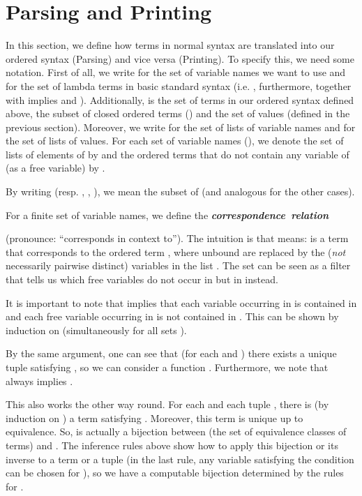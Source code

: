 \documentclass[submission,copyright,creativecommons]{eptcs}
\newcommand{\define}[1]{\mbox{\textbf{\textit{#1}}}}
\begin{document}
\section{Parsing and Printing}
\label{sec:parsing}

In this section, we define how terms in normal syntax are translated into our ordered syntax (Parsing) and vice versa (Printing). 
To specify this, we need some notation. 
First of all, we write  for the set of variable names we want to use and  for the set of lambda terms in basic standard syntax (i.e. , furthermore,  together with  implies  and ). Additionally,  is the set of terms in our ordered syntax defined above,  the subset of closed ordered terms () and  the set of values (defined in the previous section).
Moreover, we write  for the set of lists of variable names and  for the set of lists of values. 
For each set  of variable names (), we denote the set of lists of elements of  by  and the ordered terms that do not contain any variable of  (as a free variable) by .


By writing  (resp. , , ), we mean the subset  of  (and analogous for the other cases).

For a finite set  of variable names, we define the \define{correspondence relation}

(pronounce: ``corresponds in context  to'').
The intuition is that  means: 
 is a term that corresponds to the ordered term , where unbound
 are replaced by the (\emph{not} necessarily pairwise distinct)
variables in the list . 
The set  can be seen as a filter that tells us which free variables do not occur in  but in  instead.

It is important to note that  implies that each variable occurring in  is contained in  and each free variable occurring in  is not contained in . This can be shown by induction on  (simultaneously for all sets ). 

By the same argument, one can see that (for each  and ) there exists a unique tuple  satisfying , so we can consider  a function . Furthermore, we note that  always implies . 
 
This also works the other way round. For each  and each tuple
, there is (by induction on ) a
term  satisfying . Moreover,
this term  is unique up to  equivalence. So,  is actually a bijection between  (the set of
 equivalence classes of terms) and . The
inference rules above show how to apply this bijection or its inverse
to a term or a tuple (in the last rule, any variable satisfying the
condition can be chosen for ), so we have 
a computable bijection 
determined by the rules for .
\end{document}
